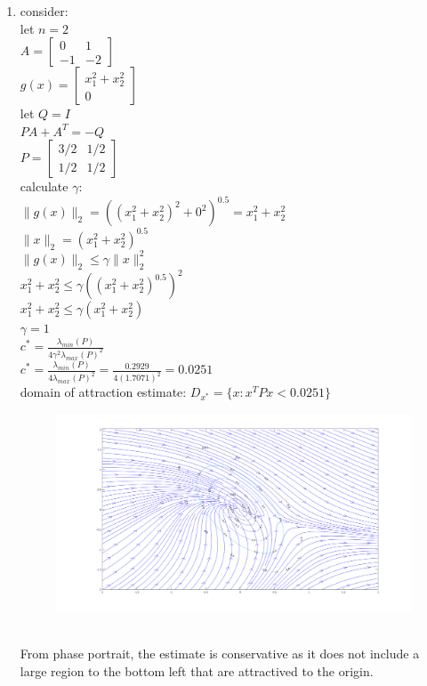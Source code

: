 \documentclass[12pt,letter]{article}
\begin{document}
\begin{itemize}
\begin{enumerate}
    \item consider:\\
      let $n=2$\\
      $A=\begin{bmatrix}0 & 1 \\ -1 & -2\end{bmatrix}$\\
      $g(x)=\begin{bmatrix}x_1^2+x_2^2 \\ 0 \end{bmatrix}$\\

      let $Q=I$\\
      $PA+A^T=-Q$\\
      $P=\begin{bmatrix}3/2 & 1/2 \\ 1/2 & 1/2 \end{bmatrix}$\\
      
      calculate $\gamma$:\\
      $\|g(x)\|_2=((x_1^2+x_2^2)^2+0^2)^{0.5}=x_1^2+x_2^2$\\
      $\|x\|_2=(x_1^2+x_2^2)^{0.5}$\\
      $\|g(x)\|_2 \leq \gamma \|x\|_2^2$\\
      $x_1^2+x_2^2 \leq \gamma ((x_1^2+x_2^2)^{0.5})^2$\\
      $x_1^2+x_2^2 \leq \gamma (x_1^2+x_2^2)$\\
      $\gamma=1$\\

      $c^*=\frac{\lambda_{min}(P)}{4\gamma^2 \lambda_{max}(P)^2}$\\
      $c^*=\frac{\lambda_{min}(P)}{4 \lambda_{max}(P)^2}=\frac{0.2929}{4(1.7071)^2}=0.0251$\\
      domain of attraction estimate: $D_{x^*}=\{x: x^TPx< 0.0251\}$
      \begin{figure}[h]
        \includegraphics[width=15cm,keepaspectratio]{matlab/pics/q3_9_phase_portrait.png}
      \end{figure}\\
      From phase portrait, the estimate is conservative as it does not include a large region to the bottom left that are attractived to the origin.\\
    \end{enumerate}


\end{itemize}
\end{document}
